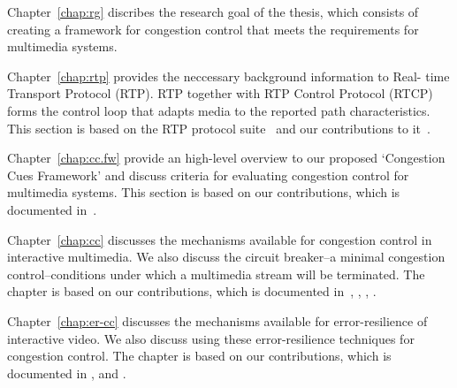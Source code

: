 Chapter~\ref{chap:rg} discribes the research goal of the thesis, which consists
of creating a framework for congestion control that meets the requirements for
multimedia systems.


Chapter~\ref{chap:rtp} provides the neccessary background information to Real-
time Transport Protocol (RTP). RTP together with RTP Control Protocol (RTCP)
forms the control loop that adapts media to the reported path characteristics.
This section is based on the RTP protocol suite~\cite{rfc3550, rfc4585,
rfc3611, rfc5104, rfc5506} and our contributions to
it~\cite{draft.xr.discard.rle, draft.xr.jb}.

Chapter~\ref{chap:cc.fw} provide an high-level overview to our proposed
`Congestion Cues Framework' and discuss criteria for evaluating congestion
control for multimedia systems. This section is based on our contributions,
which is documented in~\cite{draft.rmcat.evaluate}.



Chapter~\ref{chap:cc} discusses the mechanisms available for congestion control
in interactive multimedia. We also discuss the circuit breaker--a minimal
congestion control--conditions under which a multimedia stream will be
terminated. The chapter is based on our contributions, which is documented
in~\cite{draft.rtp.cb, Singh:control.loops.api}, ,
, .


Chapter~\ref{chap:er-cc} discusses the mechanisms available for error-resilience of
interactive video. We also discuss using these error-resilience techniques for
congestion control. The chapter is based on our contributions, which is
documented in , and .


